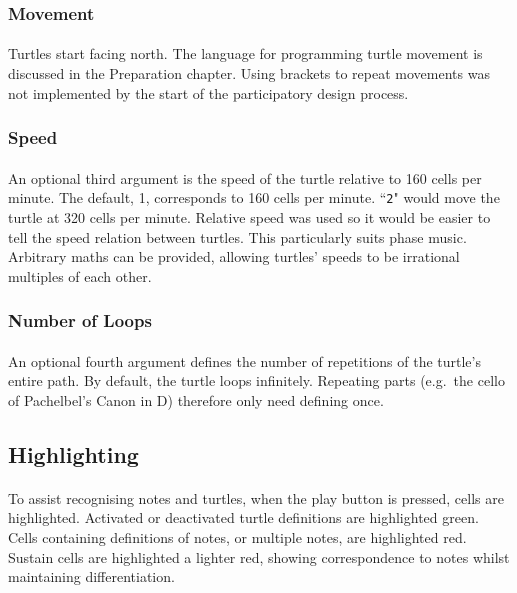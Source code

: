 \subsubsection{Movement}

\paragraph{} Turtles start facing north. The language for programming turtle movement is discussed in the Preparation chapter. Using brackets to repeat movements was not implemented by the start of the participatory design process.

\subsubsection{Speed}

\paragraph{} An optional third argument is the speed of the turtle relative to 160 cells per minute. The default, 1, corresponds to 160 cells per minute. ``\texttt{2}" would move the turtle at 320 cells per minute. Relative speed was used so it would be easier to tell the speed relation between turtles. This particularly suits phase music. Arbitrary maths can be provided, allowing turtles' speeds to be irrational multiples of each other.

\subsubsection{Number of Loops}

\paragraph{} An optional fourth argument defines the number of repetitions of the turtle's entire path. By default, the turtle loops infinitely. Repeating parts (e.g.~the cello  of Pachelbel's Canon in D) therefore only need defining once.

\subsection{Highlighting}

\paragraph{} To assist recognising notes and turtles, when the play button is pressed, cells are highlighted. Activated or deactivated turtle definitions are highlighted green. Cells containing definitions of notes, or multiple notes, are highlighted red. Sustain cells are highlighted a lighter red, showing correspondence to notes whilst maintaining differentiation.

